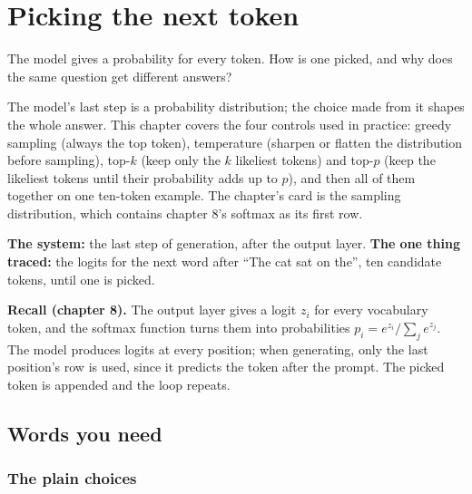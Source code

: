 \chapter{Picking the next token}
\label{ch:samp}

\begin{question}
The model gives a probability for every token. How is one picked, and why does the same question get different answers?
\end{question}

\begin{whatfor}
The model's last step is a probability distribution; the choice made from it shapes the whole answer. This chapter covers the four controls used in practice: greedy sampling (always the top token), temperature (sharpen or flatten the distribution before sampling), top-$k$ (keep only the $k$ likeliest tokens) and top-$p$ (keep the likeliest tokens until their probability adds up to $p$), and then all of them together on one ten-token example. The chapter's card is the sampling distribution, which contains chapter 8's softmax as its first row.
\end{whatfor}

\begin{setup}
\textbf{The system:} the last step of generation, after the output layer.
\textbf{The one thing traced:} the logits for the next word after ``The cat sat on the'', ten candidate tokens, until one is picked.
\end{setup}

\begin{recall}
\textbf{Recall (chapter 8).} The output layer gives a logit $z_i$ for every vocabulary token, and the softmax function turns them into probabilities $p_i = e^{z_i}/\sum_j e^{z_j}$. The model produces logits at every position; when generating, only the last position's row is used, since it predicts the token after the prompt. The picked token is appended and the loop repeats.
\end{recall}

\section{Words you need}

\subsection*{The plain choices}

